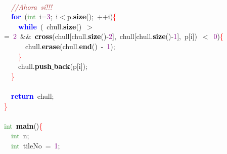 \documentclass[10pt,a4paper,twoside]{article}
\begin{document}
{{{{{{{{{{\mbox{} \\
\mbox{}\ \ \textit{\textcolor{Brown}{//Ahora\ sí!!!}} \\
\mbox{}\ \ \textbf{\textcolor{Blue}{for}}\ \textcolor{BrickRed}{(}\textcolor{ForestGreen}{int}\ i\textcolor{BrickRed}{=}\textcolor{Purple}{3}\textcolor{BrickRed}{;}\ i\textcolor{BrickRed}{$<$}p\textcolor{BrickRed}{.}\textbf{\textcolor{Black}{size}}\textcolor{BrickRed}{();}\ \textcolor{BrickRed}{++}i\textcolor{BrickRed}{)}\textcolor{Red}{\{} \\
\mbox{}\ \ \ \ \textbf{\textcolor{Blue}{while}}\ \textcolor{BrickRed}{(}\ chull\textcolor{BrickRed}{.}\textbf{\textcolor{Black}{size}}\textcolor{BrickRed}{()}\ \textcolor{BrickRed}{$>$=}\ \textcolor{Purple}{2}\ \textcolor{BrickRed}{\&\&}\ \textbf{\textcolor{Black}{cross}}\textcolor{BrickRed}{(}chull\textcolor{BrickRed}{[}chull\textcolor{BrickRed}{.}\textbf{\textcolor{Black}{size}}\textcolor{BrickRed}{()-}\textcolor{Purple}{2}\textcolor{BrickRed}{],}\ chull\textcolor{BrickRed}{[}chull\textcolor{BrickRed}{.}\textbf{\textcolor{Black}{size}}\textcolor{BrickRed}{()-}\textcolor{Purple}{1}\textcolor{BrickRed}{],}\ p\textcolor{BrickRed}{[}i\textcolor{BrickRed}{])}\ \textcolor{BrickRed}{$<$}\ \textcolor{Purple}{0}\textcolor{BrickRed}{)}\textcolor{Red}{\{} \\
\mbox{}\ \ \ \ \ \ chull\textcolor{BrickRed}{.}\textbf{\textcolor{Black}{erase}}\textcolor{BrickRed}{(}chull\textcolor{BrickRed}{.}\textbf{\textcolor{Black}{end}}\textcolor{BrickRed}{()}\ \textcolor{BrickRed}{-}\ \textcolor{Purple}{1}\textcolor{BrickRed}{);} \\
\mbox{}\ \ \ \ \textcolor{Red}{\}} \\
\mbox{}\ \ \ \ chull\textcolor{BrickRed}{.}\textbf{\textcolor{Black}{push$\_$back}}\textcolor{BrickRed}{(}p\textcolor{BrickRed}{[}i\textcolor{BrickRed}{]);} \\
\mbox{}\ \ \textcolor{Red}{\}} \\
\mbox{} \\
\mbox{}\ \ \textbf{\textcolor{Blue}{return}}\ chull\textcolor{BrickRed}{;} \\
\mbox{}\textcolor{Red}{\}} \\
\mbox{} \\
\mbox{}\textcolor{ForestGreen}{int}\ \textbf{\textcolor{Black}{main}}\textcolor{BrickRed}{()}\textcolor{Red}{\{} \\
\mbox{}\ \ \textcolor{ForestGreen}{int}\ n\textcolor{BrickRed}{;} \\
\mbox{}\ \ \textcolor{ForestGreen}{int}\ tileNo\ \textcolor{BrickRed}{=}\ \textcolor{Purple}{1}\textcolor{BrickRed}{;} \\
}}}}}}}}}}
\end{document}
